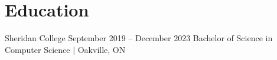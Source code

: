 \section{Education}
  \resumeSubHeadingListStart
    \resumeSubheading
      {Sheridan College} {September 2019 -- December 2023}
      {Bachelor of Science in Computer Science $|$ Oakville, ON}{}
      \resumeItemListStart
      
        
                     
      \resumeItemListEnd
    
  \resumeSubHeadingListEnd
